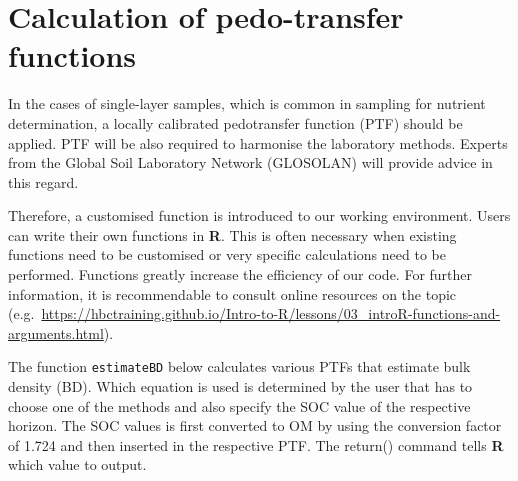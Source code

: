 \documentclass[
  10pt,
  b5paper,
  oneside]{book}
\begin{document}
\hypertarget{calculation-of-pedo-transfer-functions}{%
\section{Calculation of pedo-transfer functions}\label{calculation-of-pedo-transfer-functions}}

In the cases of single-layer samples, which is common in sampling for nutrient determination, a locally calibrated pedotransfer function (PTF) should be applied. PTF will be also required to harmonise the laboratory methods. Experts from the Global Soil Laboratory Network (GLOSOLAN) will provide advice in this regard.

Therefore, a customised function is introduced to our working environment. Users can write their own functions in \textbf{R}. This is often necessary when existing functions need to be customised or very specific calculations need to be performed. Functions greatly increase the efficiency of our code. For further information, it is recommendable to consult online resources on the topic (e.g.~\url{https://hbctraining.github.io/Intro-to-R/lessons/03_introR-functions-and-arguments.html}).

The function \texttt{estimateBD} below calculates various PTFs that estimate bulk density (BD). Which equation is used is determined by the user that has to choose one of the methods and also specify the SOC value of the respective horizon. The SOC values is first converted to OM by using the conversion factor of 1.724 and then inserted in the respective PTF. The return() command tells \textbf{R} which value to output.
\end{document}
